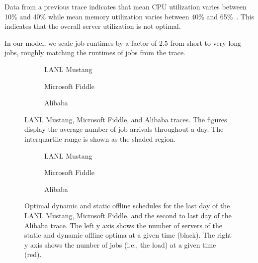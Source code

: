 Data from a previous trace indicates that mean CPU utilization varies between 10\% and 40\% while mean memory utilization varies between 40\% and 65\%~\cite{Lu2017}. This indicates that the overall server utilization is not optimal.

In our model, we scale job runtimes by a factor of 2.5 from short to very long jobs, roughly matching the runtimes of jobs from the trace.

\begin{figure}
    \begin{subfigure}[b]{.3425\linewidth}
    \resizebox{\textwidth}{!}{}
    \caption{LANL Mustang}\label{fig:los_alamos:histogram}
    \end{subfigure}
    \begin{subfigure}[b]{.32\linewidth}
    \resizebox{\textwidth}{!}{}
    \caption{Microsoft Fiddle}\label{fig:microsoft:histogram}
    \end{subfigure}
    \begin{subfigure}[b]{.32\linewidth}
    \resizebox{\textwidth}{!}{}
    \caption{Alibaba}\label{fig:alibaba:histogram}
    \end{subfigure}
    \caption{LANL Mustang, Microsoft Fiddle, and Alibaba traces. The figures display the average number of job arrivals throughout a day. The interquartile range is shown as the shaded region.}
\end{figure}

\begin{figure}
    \begin{subfigure}[b]{.345\linewidth}
    \resizebox{\textwidth}{!}{}
    \caption{LANL Mustang}\label{fig:los_alamos:schedule}
    \end{subfigure}
    \begin{subfigure}[b]{.305\linewidth}
    \resizebox{\textwidth}{!}{}
    \caption{Microsoft Fiddle}\label{fig:microsoft:schedule}
    \end{subfigure}
    \begin{subfigure}[b]{.335\linewidth}
    \resizebox{\textwidth}{!}{}
    \caption{Alibaba}\label{fig:alibaba:schedule}
    \end{subfigure}
    \caption{Optimal dynamic and static offline schedules for the last day of the LANL Mustang, Microsoft Fiddle, and the second to last day of the Alibaba trace. The left y axis shows the number of servers of the static and dynamic offline optima at a given time (black). The right y axis shows the number of jobs (i.e., the load) at a given time (red).}
\end{figure}

